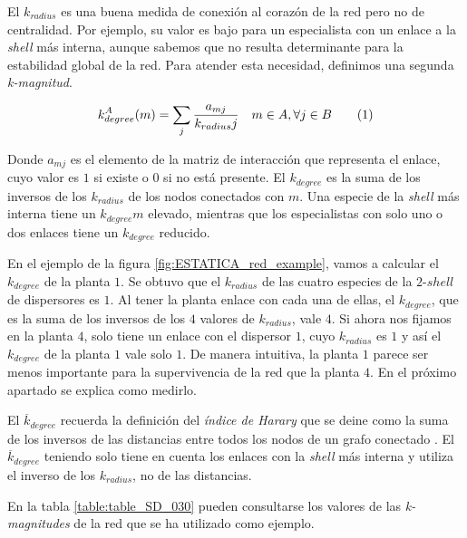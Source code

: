 El ${k}_{radius}$ es una buena medida de conexión al corazón de la red pero no de centralidad. Por ejemplo, su valor es bajo para un especialista con un enlace a la \textit{shell} más interna, aunque sabemos que no resulta determinante para la estabilidad global de la red. Para atender esta necesidad, definimos una segunda \textit{k-magnitud}.

\begin{theo} 
\begin{align*}
\displaystyle
k^A_{degree}(m) = \sum\limits_{j} \frac{a_{mj} }{k_{radius}j}  \quad   m \in A, \forall j \in B
\stepcounter{equation}\tag{\theequation}
\end{align*}
\label{kdegree}
\end{theo}

Donde $a_{mj}$ es el elemento de la matriz de interacción que representa el enlace, cuyo valor es $1$ si existe o $0$ si no está presente. El $k_{degree}$ es la suma de los inversos de los $k_{radius}$ de los nodos conectados con $m$. Una especie de la \textit{shell} más interna tiene un $k_{degree}m$ elevado,  mientras que los especialistas con solo uno o dos enlaces tiene un $k_{degree}$ reducido. 

En el ejemplo de la figura \ref{fig:ESTATICA_red_example}, vamos a calcular el $k_{degree}$ de la planta $1$. Se obtuvo que el $k_{radius}$ de las cuatro especies de la $2$-$shell$ de dispersores es $1$. Al tener la planta enlace con cada una de ellas, el $k_{degree}$, que es la suma de los inversos de los $4$ valores de $k_{radius}$, vale $4$. Si ahora nos fijamos en la planta $4$, solo tiene un enlace con el dispersor $1$, cuyo $k_{radius}$ es $1$ y así el $k_{degree}$ de la planta $1$ vale solo $1$. De manera intuitiva, la planta $1$ parece ser menos importante para la supervivencia de la red que la planta $4$. En el próximo apartado se explica como medirlo.

El  $\overline k_{degree}$ recuerda la definición del \textit{índice de Harary} que se deine como la suma de los inversos de las distancias entre todos los nodos de un grafo conectado \cite{plavvsic1993harary}. El  $\overline k_{degree}$ teniendo solo tiene en cuenta los enlaces con la \textit{shell} más interna y utiliza el inverso de los $k_{radius}$, no de las distancias.

En la tabla \ref{table:table_SD_030} pueden consultarse los valores de las \textit{k-magnitudes} de la red que se ha utilizado como ejemplo.


